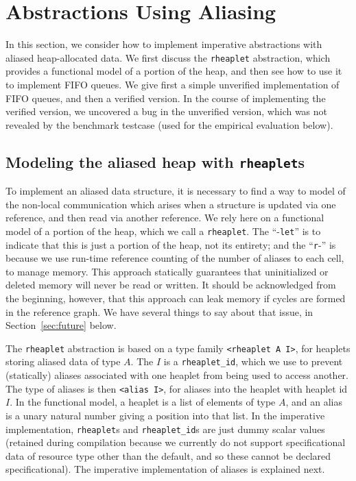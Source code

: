 \documentclass[9pt,natbib]{sigplanconf}
\begin{document}
\section{Abstractions Using Aliasing}

In this section, we consider how to implement imperative abstractions
with aliased heap-allocated data.  We first discuss the
\texttt{rheaplet} abstraction, which provides a functional model of a
portion of the heap, and then see how to use it to implement FIFO
queues.  We give first a simple unverified implementation of FIFO
queues, and then a verified version.  In the course of implementing
the verified version, we uncovered a bug in the unverified version,
which was not revealed by the benchmark testcase (used for the
empirical evaluation below).

\subsection{Modeling the aliased heap with \texttt{rheaplet}s}

To implement an aliased data structure, it is necessary to find a way
to model of the non-local communication which arises when a structure
is updated via one reference, and then read via another reference.  We
rely here on a functional model of a portion of the heap, which we
call a \texttt{rheaplet}.  The ``-\texttt{let}'' is to indicate that
this is just a portion of the heap, not its entirety; and the
``\texttt{r}-'' is because we use run-time reference counting of the
number of aliases to each cell, to manage memory.  This approach
statically guarantees that uninitialized or deleted memory will never
be read or written.  It should be acknowledged from the beginning,
however, that this approach can leak memory if cycles are formed in
the reference graph.  We have several things to say about that issue,
in Section~\ref{sec:future} below.

The \texttt{rheaplet} abstraction is based on a type family
\texttt{<rheaplet A I>}, for heaplets storing aliased data of type
$A$.  The $I$ is a \texttt{rheaplet\_id}, which we use to prevent
(statically) aliases associated with one heaplet from being used to
access another.  The type of aliases is then \texttt{<alias I>}, for
aliases into the heaplet with heaplet id $I$.  In the functional
model, a heaplet is a list of elements of type $A$, and an alias is a
unary natural number giving a position into that list.  In the
imperative implementation, \texttt{rheaplet}s and
\texttt{rheaplet\_id}s are just dummy scalar values (retained during
compilation because we currently do not support specificational data
of resource type other than the default, and so these cannot be
declared specificational).  The imperative implementation of aliases
is explained next.
\end{document}
